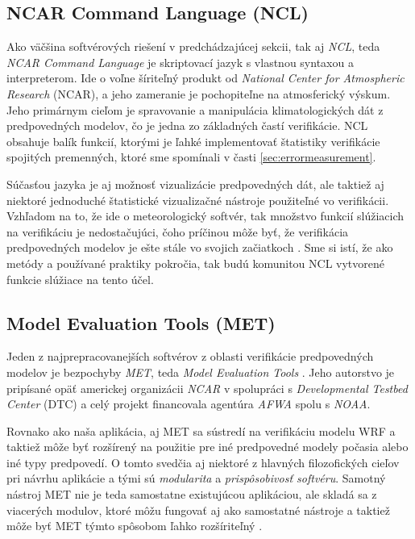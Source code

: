 \subsection[NCL]{NCAR Command Language (NCL)}
Ako väčšina softvérových riešení v predchádzajúcej sekcii, tak aj \textit{NCL}, teda \textit{NCAR Command Language} \cite{NCL} je skriptovací jazyk s vlastnou syntaxou a interpreterom. Ide o voľne šíriteľný produkt od \textit{National Center for Atmospheric Research} (NCAR), a jeho zameranie je pochopiteľne na atmosferický výskum. Jeho primárnym cieľom je spravovanie a manipulácia klimatologických dát z predpovedných modelov, čo je jedna zo základných častí verifikácie. NCL obsahuje balík funkcií, ktorými je ľahké implementovať štatistiky verifikácie spojitých premenných, ktoré sme spomínali v časti \ref{sec:errormeasurement}. 

Súčasťou jazyka je aj možnosť vizualizácie predpovedných dát, ale taktiež aj niektoré jednoduché štatistické vizualizačné nástroje použiteľné vo verifikácii. Vzhľadom na to, že ide o meteorologický softvér, tak množstvo funkcií slúžiacich na verifikáciu je nedostačujúci, čoho príčinou môže byť, že verifikácia predpovedných modelov je ešte stále vo svojich začiatkoch \cite{VerifSoft}. Sme si istí, že ako metódy a používané praktiky pokročia, tak budú komunitou NCL vytvorené funkcie slúžiace na tento účel.

\subsection[MET]{Model Evaluation Tools (MET)}
Jeden z najprepracovanejších softvérov z oblasti verifikácie predpovedných modelov je bezpochyby \textit{MET}, teda \textit{Model Evaluation Tools} \cite{MET}. Jeho autorstvo je pripísané opäť americkej organizácii \textit{NCAR} v spolupráci s \textit{Developmental Testbed Center} (DTC) a celý projekt financovala agentúra \textit{AFWA} spolu s \textit{NOAA}.

Rovnako ako naša aplikácia, aj MET sa sústredí na verifikáciu modelu WRF a taktiež môže byť rozšírený na použitie pre iné predpovedné modely počasia alebo iné typy predpovedí. O tomto svedčia aj niektoré z hlavných filozofických cieľov pri návrhu aplikácie a tými sú \textit{modularita} a \textit{prispôsobivosť softvéru}. Samotný nástroj MET nie je teda samostatne existujúcou aplikáciou, ale skladá sa z viacerých modulov, ktoré môžu fungovať aj ako samostatné nástroje a taktiež môže byť MET týmto spôsobom ľahko rozšíriteľný \cite{METuserguide}. 

